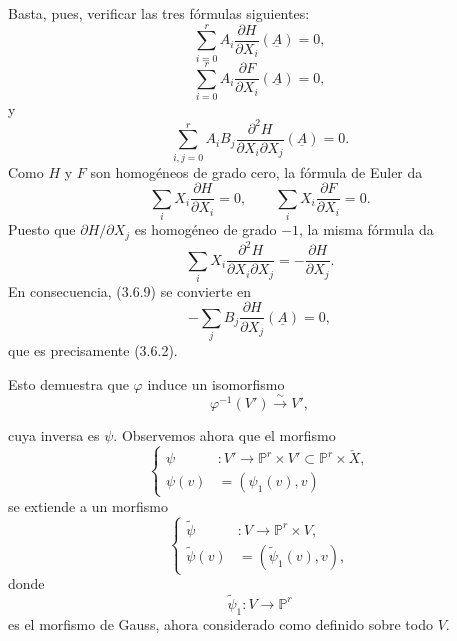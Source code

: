 \pageoriginale

Basta, pues, verificar las tres fórmulas siguientes:
\begin{equation}\tag{3.6.7}
\sum_{i=0}^{r}A_i
\frac{\partial H}{\partial X_i}(\underline A)=0,
\end{equation}
\begin{equation}\tag{3.6.8}
\sum_{i=0}^{r}A_i
\frac{\partial F}{\partial X_i}(\underline A)=0,
\end{equation}
y
\begin{equation}\tag{3.6.9}
\sum_{i,j=0}^{r}A_iB_j
\frac{\partial^2H}{\partial X_i\partial X_j}(\underline A)=0.
\end{equation}
Como $H$ y $F$ son homogéneos de grado cero, la fórmula de Euler da
\begin{equation}\tag{3.6.10}
\sum_iX_i\frac{\partial H}{\partial X_i}=0,
\qquad
\sum_iX_i\frac{\partial F}{\partial X_i}=0.
\end{equation}
Puesto que $\partial H/\partial X_j$ es homogéneo de grado $-1$, la
misma fórmula da
\[
\sum_iX_i\frac{\partial^2H}{\partial X_i\partial X_j}
=-\frac{\partial H}{\partial X_j}.
\]
En consecuencia, (3.6.9) se convierte en
\begin{equation}\tag{3.6.11}
-\sum_jB_j\frac{\partial H}{\partial X_j}(\underline A)=0,
\end{equation}
que es precisamente (3.6.2).

Esto demuestra que $\varphi$ induce un isomorfismo
\begin{equation}\tag{3.6.12}
\varphi^{-1}(V')\xrightarrow{\sim}V',
\end{equation}

\pageoriginale

cuya inversa es $\psi$. Observemos ahora que el morfismo
\begin{equation}\tag{3.6.13}
\left\{
\begin{aligned}
\psi &:V'\longrightarrow
  \mathbb P^r\times V'\subset\mathbb P^r\times\check X,\\
\psi(v)&=(\psi_1(v),v)
\end{aligned}
\right.
\end{equation}
se extiende a un morfismo
\begin{equation}\tag{3.6.14}
\left\{
\begin{aligned}
\widetilde\psi &:V\longrightarrow\mathbb P^r\times V,\\
\widetilde\psi(v)&=(\widetilde\psi_1(v),v),
\end{aligned}
\right.
\end{equation}
donde
\begin{equation}\tag{3.6.15}
\widetilde\psi_1:V\longrightarrow\mathbb P^r
\end{equation}
es el morfismo de Gauss, ahora considerado como definido sobre todo
$V$.

